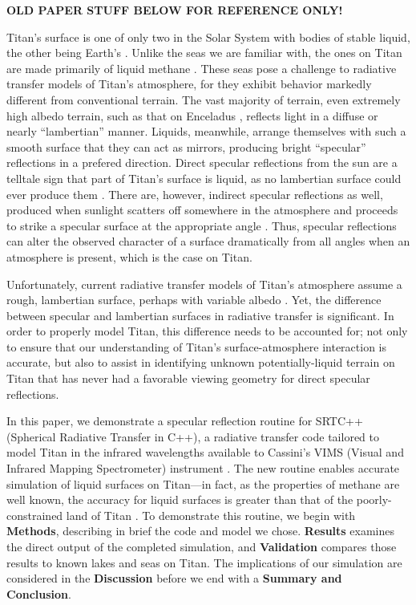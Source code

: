 \documentclass[twocolumn,linenumbers]{aastex631}
\begin{document}
\textbf{\color{red}OLD PAPER STUFF BELOW FOR REFERENCE ONLY!\color{black}}

Titan's surface is one of only two in the Solar System with bodies of stable liquid, the other being Earth's \citep{Hayes2016}. Unlike the seas we are familiar with, the ones on Titan are made primarily of liquid methane \citep{Mastrogiuseppe2016}. These seas pose a challenge to radiative transfer models of Titan's atmosphere, for they exhibit behavior markedly different from conventional terrain. The vast majority of terrain, even extremely high albedo terrain, such as that on Enceladus \citep{Li2023}, reflects light in a diffuse or nearly ``lambertian'' manner. Liquids, meanwhile, arrange themselves with such a smooth surface that they can act as mirrors, producing bright ``specular'' reflections in a prefered direction. Direct specular reflections from the sun are a telltale sign that part of Titan's surface is liquid, as no lambertian surface could ever produce them \citep{Stephan2010}. There are, however, indirect specular reflections as well, produced when sunlight scatters off somewhere in the atmosphere and proceeds to strike a specular surface at the appropriate angle \citep{Vixie2015}. Thus, specular reflections can alter the observed character of a surface dramatically from all angles when an atmosphere is present, which is the case on Titan.

Unfortunately, current radiative transfer models of Titan's atmosphere assume a rough, lambertian surface, perhaps with variable albedo \citep{Griffith2012, Xu2013, Corlies2021, Rannou2021, EsSayeh2023}. Yet, the difference between specular and lambertian surfaces in radiative transfer is significant. In order to properly model Titan, this difference needs to be accounted for; not only to ensure that our understanding of Titan's surface-atmosphere interaction is accurate, but also to assist in identifying unknown potentially-liquid terrain on Titan that has never had a favorable viewing geometry for direct specular reflections. 

In this paper, we demonstrate a specular reflection routine for SRTC++ (Spherical Radiative Transfer in C++), a radiative transfer code tailored to model Titan in the infrared wavelengths available to Cassini's VIMS (Visual and Infrared Mapping Spectrometer) instrument \citep{Barnes2018}. The new routine enables accurate simulation of liquid surfaces on Titan---in fact, as the properties of methane are well known, the accuracy for liquid surfaces is greater than that of the poorly-constrained land of Titan \citep{Trainer2018}. To demonstrate this routine, we begin with \textbf{Methods}, describing in brief the code and model we chose. \textbf{Results} examines the direct output of the completed simulation, and \textbf{Validation} compares those results to known lakes and seas on Titan. The implications of our simulation are considered in the \textbf{Discussion} before we end with a \textbf{Summary and Conclusion}.
\end{document}
